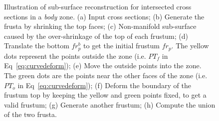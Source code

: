 \begin{figure} [htbp]
{\begin{minipage}[b]{0.23\textwidth}
    \end{minipage}}
  \caption{Illustration of sub-surface reconstruction for intersected cross sections in a \textit{body} zone.
  (a) Input cross sections;
  (b) Generate the frusta by shrinking the top faces;
  (c) Non-manifold sub-surface caused by the over-shrinkage of the top of each frustum;
  (d) Translate the bottom $fr_p^b$ to get the initial frustum $fr_p$. The yellow dots represent the points outside the zone (i.e. $PT_f$ in Eq~\ref{eq:curvedeform});
  (e) Move the outside points into the zone. The green dots are the points near the other faces of the zone (i.e. $PT_o$ in Eq~\ref{eq:curvedeform});
  (f) Deform the boundary of the frustum top by keeping the yellow and green points fixed, to get a valid frustum;
  (g) Generate another frustum;
  (h) Compute the union of the two frusta.}
  \label{fig:fruint}
\end{figure}

